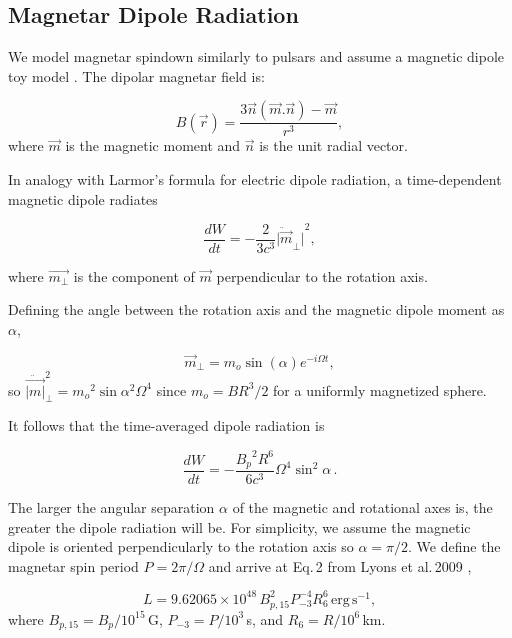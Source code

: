 \documentclass{article}
\begin{document}
\subsection{Magnetar Dipole Radiation} \label{sec:dipole}

We model magnetar spindown similarly to pulsars and assume a magnetic dipole toy model \cite{Rosswog:2007ap}. The dipolar magnetar field is:

\begin{equation} B(\vec{r})=\frac{3\vec{n}(\vec{m}.\vec{n})-\vec{m}}{r^3}, \end{equation}
where $\vec{m}$ is the magnetic moment and $\vec{n}$ is the unit radial vector.

In analogy with Larmor's formula for electric dipole radiation, a time-dependent magnetic dipole radiates

\begin{equation}
\frac{dW}{dt} = -\frac{2}{3c^3} {\ddot{|\vec{m}}_\perp|}^2,
\end{equation}

where $\vec{m_\perp}$ is the component of $\vec{m}$ perpendicular to the rotation axis.

Defining the angle between the rotation axis and the magnetic dipole moment as $\alpha$,

\begin{equation}\vec{m}_\perp = m_o  \sin({\alpha}) e^{-i\Omega t},\end{equation}
so $\ddot{\vec{|m|}}_\perp^2 = {m_o}^2 \sin{\alpha}^2 \Omega^4$
since $m_o = B R^3/2$ for a uniformly magnetized sphere.

It follows that the time-averaged dipole radiation is

\begin{equation} \label{eq:lumin}\frac{dW}{dt} = -\frac{{B_p}^2 R^6}{6c^3} \Omega^4 \sin^2{\alpha}\,.\end{equation}

The larger the angular separation $\alpha$ of the magnetic and rotational axes is, the greater the dipole radiation will be. For simplicity, we assume the magnetic dipole is oriented perpendicularly to the rotation axis so $\alpha=\pi/2$. We define the magnetar spin period $P= 2\pi/\Omega$ and arrive at Eq.\,2 from Lyons et al.\,2009 \cite{Lyons:2009ka},

\begin{equation} \label{eq:lum} L  = 9.62065 \times 10^{48}\, B^2_{p,15} P^{-4}_{-3} R^6_6\,\mathrm{erg \,s^{-1}},\end{equation}
where $B_{p,15} = B_p/10^{15}$\,G, $P_{-3}=P/10^3$\,s, and $R_6=R/10^6$\,km.
\end{document}
